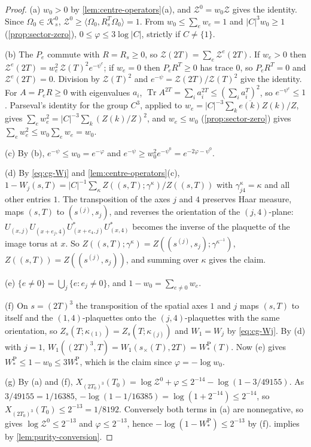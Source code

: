 \documentclass[11pt,a4paper]{amsart}
\theoremstyle{definition}
\theoremstyle{remark}
\numberwithin{equation}{section}
\DeclareMathOperator{\Tr}{Tr}        %
\newcommand{\Kspace}{\mathcal{K}}    %
\newcommand{\ip}[2]{\langle #1,#2\rangle}  %
\newcommand{\abs}[1]{\lvert #1\rvert}      %
\newcommand{\TT}{\mathbb{T}}               %
\newcommand{\Zc}{\mathcal{Z}}              %
\newcommand{\XT}[2]{X_{#1}(#2)}            %
\newcommand{\cube}[1]{(2#1)^3}             %
\newcommand{\Omegazero}{\Omega_0}          %
\newcommand{\xconst}{\frac{1}{8192}}       %
\newcommand{\xconstinl}{1/8192}            %
\newcommand{\Mcirc}{\text{\upshape(M$^{\circ}$)}}   %
\newcommand{\Bcirc}{\text{\upshape(B$^{\circ}$)}}   %
\begin{document}
\begin{proof}
(a) $w_0>0$ by \cref{lem:centre-operators}\textup{(a)}, and $\Zc^0=w_0\Zc$ gives the identity. Since $\Omegazero\in\Kspace^0_s$, $\Zc^0\ge\ip{\Omegazero}{R_s^T\Omegazero}=1$. From $w_0\le\sum_ew_e=1$ and $\abs{C}^3w_0\ge1$ (\cref{prop:sector-zero}), $0\le\varphi\le3\log\abs{C}$, strictly if $C\ne\{1\}$.

(b) The $P_e$ commute with $R=R_s\ge0$, so $\Zc(2T)=\sum_e\Zc^e(2T)$. If $w_e>0$ then $\Zc^e(2T)=w_e^2\,\Zc(T)^2e^{-\psi^e}$; if $w_e=0$ then $P_eR^T\ge0$ has trace $0$, so $P_eR^T=0$ and $\Zc^e(2T)=0$. Division by $\Zc(T)^2$ and $e^{-\psi}=\Zc(2T)/\Zc(T)^2$ give the identity. For $A=P_eR\ge0$ with eigenvalues $a_i$, $\Tr A^{2T}=\sum_ia_i^{2T}\le(\sum_ia_i^T)^2$, so $e^{-\psi^e}\le1$. Parseval's identity for the group $C^3$, applied to $w_e=\abs{C}^{-3}\sum_k\overline{e(k)}Z(k)/Z$, gives $\sum_ew_e^2=\abs{C}^{-3}\sum_k(Z(k)/Z)^2$, and $w_e\le w_0$ (\cref{prop:sector-zero}) gives $\sum_ew_e^2\le w_0\sum_ew_e=w_0$.

(c) By (b), $e^{-\psi}\le w_0=e^{-\varphi}$ and $e^{-\psi}\ge w_0^2e^{-\psi^0}=e^{-2\varphi-\psi^0}$.

(d) By \eqref{eq:cg-Wj} and \cref{lem:centre-operators}\textup{(c)}, $1-W_j(s,T)=\abs{C}^{-1}\sum_\kappa Z((s,T);\gamma^\kappa)/Z((s,T))$ with $\gamma^\kappa_{j4}=\kappa$ and all other entries $1$. The transposition of the axes $j$ and $4$ preserves Haar measure, maps $(s,T)$ to $(s^{(j)},s_j)$, and reverses the orientation of the $(j,4)$-plane: $U_{(x,j)}U_{(x+e_j,4)}U^*_{(x+e_4,j)}U^*_{(x,4)}$ becomes the inverse of the plaquette of the image torus at $x$. So $Z((s,T);\gamma^\kappa)=Z((s^{(j)},s_j);\gamma^{\kappa^{-1}})$, $Z((s,T))=Z((s^{(j)},s_j))$, and summing over $\kappa$ gives the claim.

(e) $\{e\ne0\}=\bigcup_j\{e:e_j\ne0\}$, and $1-w_0=\sum_{e\ne0}w_e$.

(f) On $s=\cube T$ the transposition of the spatial axes $1$ and $j$ maps $(s,T)$ to itself and the $(1,4)$-plaquettes onto the $(j,4)$-plaquettes with the same orientation, so $Z_s(T;\kappa_{(1)})=Z_s(T;\kappa_{(j)})$ and $W_1=W_j$ by \eqref{eq:cg-Wj}. By (d) with $j=1$, $W_1(\cube T,T)=W_1(s_\times(T),2T)=W^{\mathrm P}_*(T)$. Now (e) gives $W^{\mathrm P}_*\le1-w_0\le3W^{\mathrm P}_*$, which is the claim since $\varphi=-\log w_0$.

(g) By (a) and (f), $\XT{\cube{T_0}}{T_0}=\log\Zc^0+\varphi\le2^{-14}-\log(1-3/49155)$. As $3/49155=1/16385$, $-\log(1-1/16385)=\log(1+2^{-14})\le2^{-14}$, so $\XT{\cube{T_0}}{T_0}\le2^{-13}=\xconstinl$. Conversely both terms in (a) are nonnegative, so \Bcirc{} gives $\log\Zc^0\le2^{-13}$ and $\varphi\le2^{-13}$, hence $-\log(1-W^{\mathrm P}_*)\le2^{-13}$ by (f). \Mcirc{} implies \Bcirc{} by \cref{lem:purity-conversion}.
\end{proof}
\end{document}
